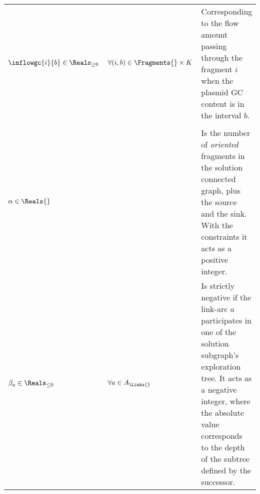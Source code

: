 \begin{table}
\begin{longtable}{@{}llp{}@{}}
    \addlinespace
    \(\inflowgc{i}{b} \in \Reals_{\geq 0}\) & \(\forall (i, b) \in \Fragments{} \times K\) & Corresponding to the flow amount passing through the fragment \(i\) when the plasmid GC content is in the interval \(b\). \\
    \addlinespace
    \multicolumn{3}{@{}l@{}}{\tabhtxt{Connected component variables}} \\
    \addlinespace
    \(\alpha \in \Reals{}\) & & Is the number of \emph{oriented} fragments in the solution connected graph, plus the source and the sink. With the constraints it acts as a positive integer. \\
    \addlinespace
    \(\beta_a \in \Reals_{\leq 0}\) & \(\forall a \in A_\Links{}\) & Is strictly negative if the link-arc \(a\) participates in one of the solution subgraph's exploration tree. It acts as a negative integer, where the absolute value corresponds to the depth of the subtree defined by the successor. \\
    \bottomrule
  \end{longtable}
\end{table}